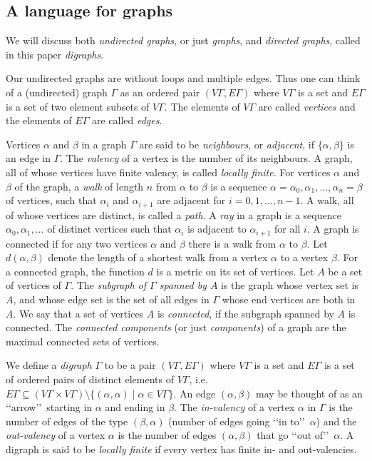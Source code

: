 \documentclass{emsprocart}
\theoremstyle{definition}
\begin{document}
\subsection{A language for graphs}\label{SGraphs}
We will discuss both {\em undirected graphs}, or just {\em
  graphs}, and {\em directed graphs},  called in this paper {\em
  digraphs}.

Our undirected graphs are without loops and multiple edges.  Thus
one can think of a (undirected)
graph $\Gamma$ as an ordered pair $(V\Gamma, E\Gamma)$ where
$V\Gamma$ is a set and $E\Gamma$ is a set of two element subsets of
$V\Gamma$.  The
elements of $V\Gamma$ are called {\em vertices} and the elements of
$E\Gamma$ are called {\em edges}.

Vertices $\alpha$ and $\beta$ in a graph $\Gamma$ are said to be
{\em neighbours}, or {\em adjacent}, if $\{\alpha, \beta\}$ is an edge
in $\Gamma$.   The {\em valency} of a vertex is the number of its
neighbours. A graph, all  of whose vertices have finite valency,
is called {\em locally finite}.
For vertices $\alpha$ and $\beta$ of the graph, a \emph{walk} of length $n$
from $\alpha$ to $\beta$ is a sequence $\alpha=\alpha_0,\alpha_1,\ldots,\alpha_n=\beta$
of vertices, such that $\alpha_i$
and $\alpha_{i+1}$ are adjacent for $i=0, 1, \ldots, n-1$.  A walk, all
of whose vertices are distinct, is called a {\em path}.
A {\em ray} in a graph is a sequence $\alpha_0, \alpha_1, \ldots$ of
distinct vertices such that $\alpha_i$ is adjacent to $\alpha_{i+1}$
for all $i$.
 A graph
is connected if for any two vertices $\alpha$ and $\beta$ there is a
walk from $\alpha$ to $\beta$.  Let $d(\alpha,\beta)$ denote the length of
a shortest walk from a vertex $\alpha$ to a vertex $\beta$. For a connected
graph, the function $d$ is a metric on its set of vertices.
Let $A$ be a set of vertices of $\Gamma$.  The
{\em subgraph of $\Gamma$ spanned by $A$} is the graph whose vertex set is $A$,
and whose edge set is the set of all edges in $\Gamma$ whose end vertices are
both in $A$.  We say that a set of vertices $A$ is {\em
  connected}, if the subgraph spanned by $A$ is connected.  The {\em
  connected components}  (or just {\em components}) of a graph are the
maximal connected sets of vertices.

\medskip

We define a {\em digraph} $\Gamma$
to be a pair $(V\Gamma, E\Gamma)$ where
$V\Gamma$ is a set and $E\Gamma$ is a set of ordered pairs of distinct
elements of $V\Gamma$, i.e. $E\Gamma\subseteq (V\Gamma\times V\Gamma)
\setminus\{(\alpha, \alpha)\mid \alpha\in V\Gamma\}$.  An edge
$(\alpha, \beta)$ may be thought of as an \lq\lq arrow\rq\rq\ starting
in $\alpha$ and
ending in $\beta$.
The
{\em in-valency} of a vertex $\alpha$ in $\Gamma$ is the number of
edges of the type $(\beta, \alpha)$ (number of edges going \lq\lq in
to\rq\rq\ $\alpha$) and the {\em out-valency} of a vertex $\alpha$
is the number of edges $(\alpha, \beta)$ that go \lq\lq out of\rq\rq\
$\alpha$.
A digraph is said to be {\em locally finite} if every vertex has
finite in- and out-valencies.
\end{document}
